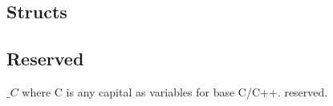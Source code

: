 
\subsection{Structs}

\subsection{Reserved}
\(\_C\) where C is any capital as variables for base C/C++. reserved.

